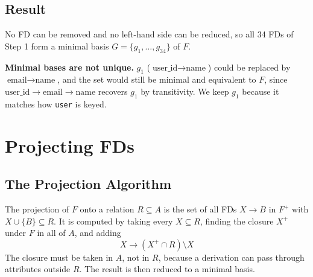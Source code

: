 \documentclass{article}
\newcommand{\at}[1]{\text{#1}}
\begin{document}
\subsection*{Result}

No FD can be removed and no left-hand side can be reduced, so all 34 FDs of Step 1 form a minimal basis $G = \{g_1, \dots, g_{34}\}$ of $F$.

\textbf{Minimal bases are not unique.} $g_1$ ($\at{user\_id} \rightarrow \at{name}$) could be replaced by $\at{email} \rightarrow \at{name}$, and the set would still be minimal and equivalent to $F$, since $\at{user\_id} \rightarrow \at{email} \rightarrow \at{name}$ recovers $g_1$ by transitivity. We keep $g_1$ because it matches how \texttt{user} is keyed.

\section{Projecting FDs}

\subsection*{The Projection Algorithm}

The projection of $F$ onto a relation $R \subseteq A$ is the set of all FDs $X \rightarrow B$ in $F^+$ with $X \cup \{B\} \subseteq R$. It is computed by taking every $X \subseteq R$, finding the closure $X^+$ under $F$ in all of $A$, and adding
\[
  X \rightarrow (X^+ \cap R) \setminus X
\]
The closure must be taken in $A$, not in $R$, because a derivation can pass through attributes outside $R$. The result is then reduced to a minimal basis.
\end{document}
